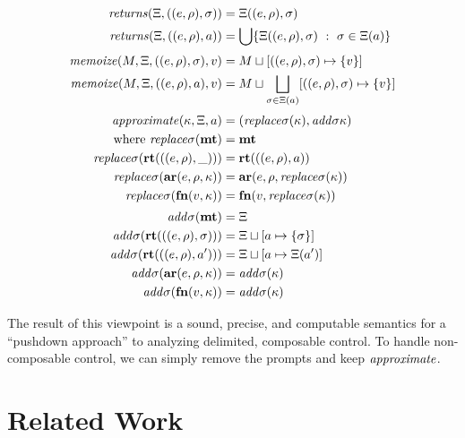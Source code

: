\documentclass{llncs}
\begin{document}
\newcommand{\replacectx}{\mathit{replace}\mstore}
\newcommand{\addstore}{\mathit{add}\mstore}
\begin{align*}
  \returns(\mktab, ((\mexpr,\menv), \mstore)) &= \mktab((\mexpr,\menv), \mstore) \\
  \returns(\mktab, ((\mexpr,\menv), \maddr)) &=
    \bigcup\setbuild{\mktab((\mexpr,\menv),\mstore)}{\mstore \in \mktab(\maddr)}
  \\[2pt]
  \memoize(\mmemo, \mktab, ((\mexpr,\menv), \mstore), \mval) &=
    \joinone{\mmemo}{((\mexpr,\menv), \mstore)}{\mval} \\
  \memoize(\mmemo, \mktab, ((\mexpr,\menv), \maddr), \mval) &=
    \mmemo \sqcup \bigsqcup\limits_{\mstore \in \mktab(\maddr)}\snglm{((\mexpr,\menv), \mstore)}{\mval}
  \\[2pt]
  \approximate(\mkont, \mktab, \maddr) &= (\replacectx(\mkont), \addstore{\mkont}) \\
  \text{where }
   \replacectx(\kmt) &= \kmt \\
   \replacectx(\krt{((\mexpr,\menv),\_)}) &= \krt{((\mexpr,\menv),\maddr)} \\
   \replacectx(\kar{\mexpr,\menv,\mkont}) &= \kar{\mexpr,\menv,\replacectx(\mkont)} \\
   \replacectx(\kfn{\mval, \mkont}) &= \kfn{\mval,\replacectx(\mkont)}
  \\[2pt]
   \addstore(\kmt) &= \mktab \\
   \addstore(\krt{((\mexpr,\menv),\mstore)}) &= \joinone{\mktab}{\maddr}{\mstore} \\
   \addstore(\krt{((\mexpr,\menv),\maddr')}) &= \joinm{\mktab}{\maddr}{\mktab(\maddr')} \\
   \addstore(\kar{\mexpr,\menv,\mkont}) &= \addstore(\mkont) \\
   \addstore(\kfn{\mval, \mkont}) &= \addstore(\mkont)
\end{align*}

The result of this viewpoint is a sound, precise, and computable
semantics for a ``pushdown approach'' to analyzing delimited,
composable control. To handle non-composable control, we can simply
remove the prompts and keep $\mathit{approximate}$.

\section{Related Work}
\end{document}
